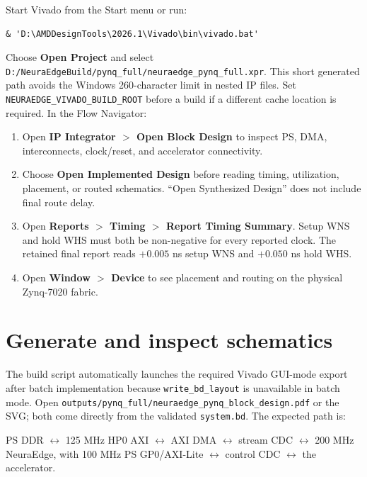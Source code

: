 \documentclass[10pt]{article}
\begin{document}
Start Vivado from the Start menu or run:

\begin{lstlisting}
& 'D:\AMDDesignTools\2026.1\Vivado\bin\vivado.bat'
\end{lstlisting}

Choose \textbf{Open Project} and select
\texttt{D:/NeuraEdgeBuild/pynq\_full/neuraedge\_pynq\_full.xpr}. This short
generated path avoids the Windows 260-character limit in nested IP files. Set
\texttt{NEURAEDGE\_VIVADO\_BUILD\_ROOT} before a build if a different cache
location is required. In the Flow Navigator:

\begin{enumerate}
  \item Open \textbf{IP Integrator $>$ Open Block Design} to inspect PS, DMA,
  interconnects, clock/reset, and accelerator connectivity.
  \item Choose \textbf{Open Implemented Design} before reading timing,
  utilization, placement, or routed schematics. ``Open Synthesized Design''
  does not include final route delay.
  \item Open \textbf{Reports $>$ Timing $>$ Report Timing Summary}. Setup WNS
  and hold WHS must both be non-negative for every reported clock. The retained
  final report reads $+0.005$ ns setup WNS and $+0.050$ ns hold WHS.
  \item Open \textbf{Window $>$ Device} to see placement and routing on the
  physical Zynq-7020 fabric.
\end{enumerate}

\section{Generate and inspect schematics}

The build script automatically launches the required Vivado GUI-mode export
after batch implementation because \texttt{write\_bd\_layout} is unavailable
in batch mode. Open
\texttt{outputs/pynq\_full/neuraedge\_pynq\_block\_design.pdf} or the SVG; both
come directly from the validated \texttt{system.bd}. The expected path is:

\begin{center}
PS DDR $\leftrightarrow$ 125 MHz HP0 AXI $\leftrightarrow$ AXI DMA
$\leftrightarrow$ stream CDC $\leftrightarrow$ 200 MHz NeuraEdge,
with 100 MHz PS GP0/AXI-Lite $\leftrightarrow$ control CDC $\leftrightarrow$
the accelerator.
\end{center}
\end{document}
